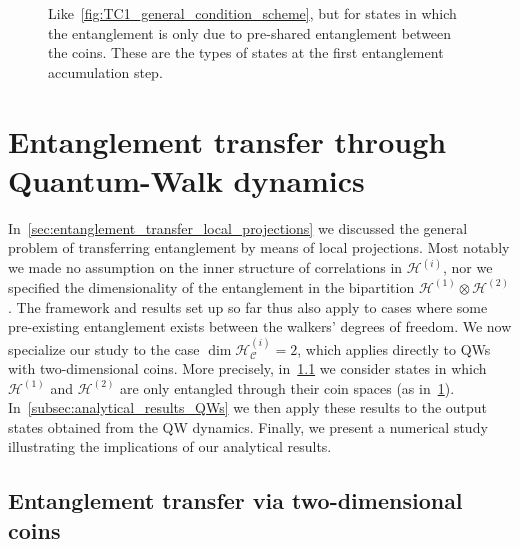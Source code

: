 \documentclass[
	aps, pra,
	superscriptaddress, twocolumn,
	floatfix,
	10pt
]{revtex4-1}
\newcommand{\calC}{{\mathcal{C}}}
\newcommand{\calH}{{\mathcal{H}}}
\newcommand{\HC}{\calH_\calC}
\begin{document}
\begin{figure}[b]
    \centering
    
    \caption{
        Like~\cref{fig:TC1_general_condition_scheme}, but for states in which the entanglement is only due to pre-shared entanglement between the coins. These are the types of states at the first entanglement accumulation step.
    }
    \label{fig:TC1_condition_scheme}
\end{figure}

\section{Entanglement transfer through Quantum-Walk dynamics}
\label{sec:entanglement_transfer_in_QWs}

In~\cref{sec:entanglement_transfer_local_projections} we discussed the general problem of transferring entanglement by means of local projections.
Most notably we made no assumption on the inner structure of correlations in $\calH^{(i)}$, nor we specified the dimensionality of the entanglement in the bipartition $\calH^{(1)}\otimes\calH^{(2)}$. The framework and results set up so far thus also apply to %
cases where some pre-existing entanglement exists between the walkers' degrees of freedom.
We now specialize our study to the case $\dim\HC^{(i)}=2$, which applies directly to QWs with two-dimensional coins.
More precisely, in~\cref{subsec:generalsolution_firstiteration_2Dcoin} we consider states in which $\calH^{(1)}$ and $\calH^{(2)}$ are only entangled through their coin spaces (as in~\cref{fig:TC1_condition_scheme}).
In~\cref{subsec:analytical_results_QWs} we then apply these results to the output states obtained from the QW dynamics.
Finally, we present a numerical study illustrating the implications of our analytical results.

\subsection{Entanglement transfer via two-dimensional coins}
\label{subsec:generalsolution_firstiteration_2Dcoin}
\end{document}
